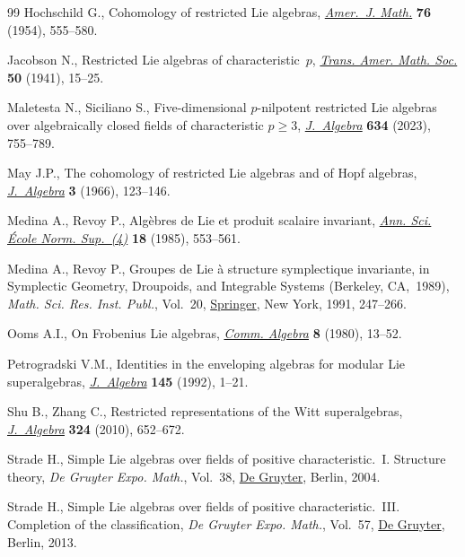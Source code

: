\documentclass[10pt,a4paper]{amsart}
\numberwithin{equation}{section}
\begin{document}
\begin{thebibliography}{99}
Hochschild G., Cohomology of restricted {L}ie algebras, \href{https://doi.org/10.2307/2372701}{\textit{Amer.~J. Math.}}
 \textbf{76} (1954), 555--580.

Jacobson N., Restricted {L}ie algebras of characteristic~{$p$}, \href{https://doi.org/10.2307/1989908}{\textit{Trans.
 Amer. Math. Soc.}} \textbf{50} (1941), 15--25.

Maletesta N., Siciliano S., Five-dimensional {$p$}-nilpotent restricted {L}ie
 algebras over algebraically closed fields of characteristic {$p\geq3$},
 \href{https://doi.org/10.1016/j.jalgebra.2023.05.029}{\textit{J.~Algebra}} \textbf{634} (2023), 755--789.

May J.P., The cohomology of restricted {L}ie algebras and of {H}opf algebras,
 \href{https://doi.org/10.1016/0021-8693(66)90009-3}{\textit{J.~Algebra}} \textbf{3} (1966), 123--146.

Medina A., Revoy P., Alg\`ebres de {L}ie et produit scalaire invariant,
 \href{https://doi.org/10.24033/asens.1496}{\textit{Ann. Sci. \'Ecole Norm. Sup.~(4)}} \textbf{18} (1985), 553--561.

Medina A., Revoy P., Groupes de {L}ie \`a structure symplectique invariante, in
 Symplectic {G}eometry, {D}roupoids, and {I}ntegrable {S}ystems ({B}erkeley,
 {CA},~1989), \textit{Math. Sci. Res. Inst. Publ.}, Vol.~20, \href{https://doi.org/10.1007/978-1-4613-9719-9_17}{Springer}, New
 York, 1991, 247--266.

Ooms A.I., On {F}robenius {L}ie algebras, \href{https://doi.org/10.1080/00927878008822445}{\textit{Comm. Algebra}} \textbf{8}
 (1980), 13--52.

Petrogradski V.M., Identities in the enveloping algebras for modular {L}ie
 superalgebras, \href{https://doi.org/10.1016/0021-8693(92)90173-J}{\textit{J.~Algebra}} \textbf{145} (1992), 1--21.

Shu B., Zhang C., Restricted representations of the {W}itt superalgebras,
 \href{https://doi.org/10.1016/j.jalgebra.2010.04.032}{\textit{J.~Algebra}} \textbf{324} (2010), 652--672.

Strade H., Simple {L}ie algebras over fields of positive characteristic.~{I}.
 {S}tructure theory, \textit{De Gruyter Expo. Math.}, Vol.~38, \href{https://doi.org/10.1515/9783110197945}{De Gruyter},
 Berlin, 2004.

Strade H., Simple {L}ie algebras over fields of positive characteristic.~{III}.
 {C}ompletion of the classification, \textit{De Gruyter Expo. Math.}, Vol.~57,
 \href{https://doi.org/10.1515/9783110263015}{De Gruyter}, Berlin, 2013.


\end{thebibliography}
\end{document}
